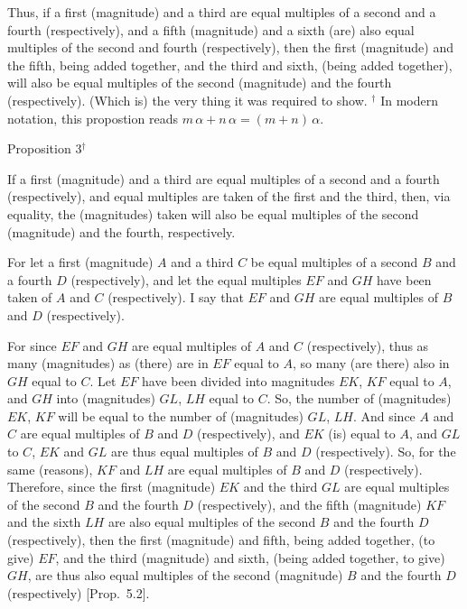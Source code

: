 Thus, if a first (magnitude) and a third are equal multiples of a second
and a fourth (respectively), and a fifth (magnitude) and a sixth (are) also equal multiples of the
second and fourth (respectively), then the  first (magnitude) and the fifth, being
added together, and the third  and sixth, (being added together), will also be equal multiples of the
second (magnitude) and the fourth (respectively). (Which is) the very thing it was required to
show.
{\footnotesize \noindent$^\dag$ In modern notation, this propostion reads
$m\,\alpha+n\,\alpha = (m+n)\,\alpha$.}


\begin{center}
{\large Proposition 3}$^\dag$
\end{center}

If a first (magnitude) and a third are equal multiples
of a second and a fourth (respectively), and equal multiples are taken of the
first and the third, then, via equality,  the 
(magnitudes) taken will also be equal multiples of the second (magnitude) and the fourth, respectively.

For let a first (magnitude) $A$ and a third $C$ be equal multiples of a
second $B$ and a fourth $D$ (respectively), and let the equal multiples
$EF$ and $GH$ have been taken of $A$ and $C$ (respectively). I say that
$EF$ and $GH$ are equal multiples of $B$ and $D$ (respectively).

For since $EF$ and $GH$ are equal multiples of $A$ and $C$ (respectively), thus as many (magnitudes) as (there) are in $EF$ equal to $A$, so many (are there) also in
$GH$ equal to $C$. Let $EF$ have been divided into magnitudes $EK$, $KF$ equal
to $A$, and $GH$ into (magnitudes) $GL$, $LH$ equal to $C$. So, the number of (magnitudes)
$EK$, $KF$ will be equal to the number of (magnitudes) $GL$, $LH$.
And since $A$ and $C$ are equal multiples of $B$ and $D$ (respectively), and $EK$ (is)
equal to $A$, and $GL$ to $C$,  $EK$ and $GL$ are thus equal multiples of $B$ and $D$
(respectively). So, for the same (reasons), $KF$ and $LH$ are equal multiples
of $B$ and $D$ (respectively). Therefore, since the first (magnitude) $EK$ and the
third $GL$ are equal multiples of the second $B$ and the fourth $D$ (respectively), and the fifth (magnitude) $KF$ and
the sixth $LH$ are  also  equal multiples of the second $B$ and the fourth $D$ (respectively),  then  the first (magnitude) and fifth, being added together,
(to give) $EF$, and the third (magnitude) and sixth, (being added together, to give) $GH$, are thus also equal multiples of the second (magnitude) $B$ and the fourth $D$ (respectively) [Prop.~5.2].

